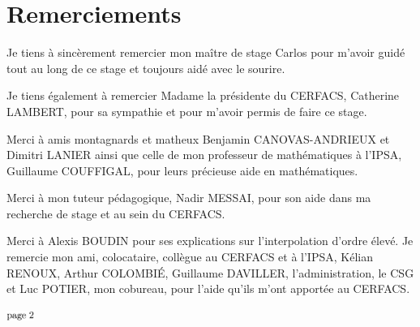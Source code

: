 \chapter*{Remerciements}

Je tiens à sincèrement remercier mon maître de stage Carlos pour m'avoir guidé tout au long de ce stage et toujours aidé avec le sourire.

\vspace{0.5cm}

Je tiens également à remercier Madame la présidente du CERFACS, Catherine LAMBERT, pour sa sympathie et pour m'avoir permis de faire ce stage. %

Merci à amis montagnards et matheux Benjamin CANOVAS-ANDRIEUX et Dimitri LANIER ainsi que celle de mon professeur de mathématiques à l'IPSA, Guillaume COUFFIGAL, pour leurs précieuse aide en mathématiques.

Merci à mon tuteur pédagogique, Nadir MESSAI, pour son aide dans ma recherche de stage et au sein du CERFACS.

Merci à Alexis BOUDIN pour ses explications sur l'interpolation d'ordre élevé.
Je remercie mon ami, colocataire, collègue au CERFACS et à l'IPSA, Kélian RENOUX, Arthur COLOMBIÉ, Guillaume DAVILLER, l'administration, le CSG et Luc POTIER, mon cobureau, pour l'aide qu'ils m'ont apportée au CERFACS.




\vspace*{\fill} %
\begin{center}
    \includegraphics[width=0.067\textwidth]{images/page_2.png}
\end{center}
\vspace*{-13.5cm} %
\vspace*{\fill} %
